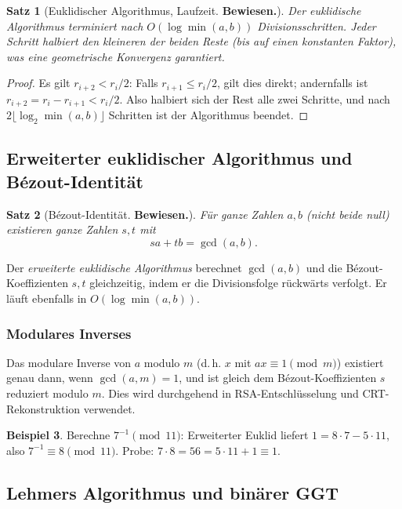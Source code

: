 \documentclass[12pt,a4paper]{amsart}
\newtheorem{theorem}{Satz}[section]
\theoremstyle{definition}
\newtheorem{beispiel}[theorem]{Beispiel}
\begin{document}
\begin{theorem}[Euklidischer Algorithmus, Laufzeit. \textbf{Bewiesen.}]
Der euklidische Algorithmus terminiert nach $O(\log\min(a,b))$ Divisionsschritten.
Jeder Schritt halbiert den kleineren der beiden Reste (bis auf einen konstanten
Faktor), was eine geometrische Konvergenz garantiert.
\end{theorem}

\begin{proof}
Es gilt $r_{i+2} < r_i/2$: Falls $r_{i+1} \le r_i/2$, gilt dies direkt;
andernfalls ist $r_{i+2} = r_i - r_{i+1} < r_i/2$. Also halbiert sich der
Rest alle zwei Schritte, und nach $2\lfloor\log_2 \min(a,b)\rfloor$ Schritten
ist der Algorithmus beendet.
\end{proof}

\subsection{Erweiterter euklidischer Algorithmus und Bézout-Identität}

\begin{theorem}[Bézout-Identität. \textbf{Bewiesen.}]
Für ganze Zahlen $a,b$ (nicht beide null) existieren ganze Zahlen $s,t$ mit
\[
  sa + tb = \gcd(a,b).
\]
\end{theorem}

Der \emph{erweiterte euklidische Algorithmus} berechnet $\gcd(a,b)$ und die
Bézout-Koeffizienten $s,t$ gleichzeitig, indem er die Divisionsfolge
rückwärts verfolgt. Er läuft ebenfalls in $O(\log\min(a,b))$.

\subsubsection*{Modulares Inverses}

Das modulare Inverse von $a$ modulo $m$ (d.\,h. $x$ mit $ax \equiv 1 \pmod{m}$)
existiert genau dann, wenn $\gcd(a,m) = 1$, und ist gleich dem Bézout-Koeffizienten
$s$ reduziert modulo $m$. Dies wird durchgehend in RSA-Entschlüsselung und
CRT-Rekonstruktion verwendet.

\begin{beispiel}
Berechne $7^{-1} \pmod{11}$: Erweiterter Euklid liefert $1 = 8\cdot 7 - 5\cdot 11$,
also $7^{-1} \equiv 8 \pmod{11}$. Probe: $7 \cdot 8 = 56 = 5\cdot 11 + 1 \equiv 1$.
\end{beispiel}

\subsection{Lehmers Algorithmus und binärer GGT}
\end{document}
